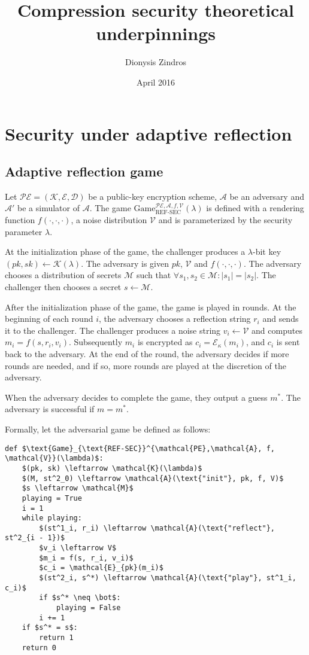 \documentclass{article}
\title{Compression security theoretical underpinnings}
\author{Dionysis Zindros}
\date{April 2016}
\begin{document}
\maketitle

\section*{Security under adaptive reflection}

\subsection*{Adaptive reflection game}

Let $\mathcal{PE} = (\mathcal{K}, \mathcal{E}, \mathcal{D})$ be a public-key
encryption scheme, $\mathcal{A}$ be an adversary and $\mathcal{A'}$ be a
simulator of $\mathcal{A}$.  The game
$\text{Game}_{\text{REF-SEC}}^{\mathcal{PE},\mathcal{A}, f,
\mathcal{V}}(\lambda)$ is defined with a rendering function $f(\cdot, \cdot,
\cdot)$, a noise distribution $\mathcal{V}$ and is parameterized by the
security parameter $\lambda$.

At the initialization phase of the game, the challenger produces a
$\lambda$-bit key $(pk, sk) \leftarrow \mathcal{K}(\lambda)$. The adversary is
given $pk$, $\mathcal{V}$ and $f(\cdot, \cdot, \cdot)$.  The adversary chooses
a distribution of secrets $\mathcal{M}$ such that $\forall s_1, s_2 \in
\mathcal{M}: |s_1| = |s_2|$.  The challenger then chooses a secret $s
\leftarrow \mathcal{M}$.

After the initialization phase of the game, the game is played in rounds. At
the beginning of each round $i$, the adversary chooses a reflection string
$r_i$ and sends it to the challenger. The challenger produces a noise string
$v_i \leftarrow \mathcal{V}$ and computes $m_i = f(s, r_i, v_i)$.  Subsequently
$m_i$ is encrypted as $c_i = \mathcal{E}_\kappa(m_i)$, and $c_i$ is sent back
to the adversary. At the end of the round, the adversary  decides if more
rounds are needed, and if so, more rounds are played at the discretion of the
adversary.

When the adversary decides to complete the game, they output a guess $m^*$. The
adversary is successful if $m = m^*$.

Formally, let the adversarial game be defined as follows:

\begin{lstlisting}[texcl,mathescape]
def $\text{Game}_{\text{REF-SEC}}^{\mathcal{PE},\mathcal{A}, f,
\mathcal{V}}(\lambda)$:
    $(pk, sk) \leftarrow \mathcal{K}(\lambda)$
    $(M, st^2_0) \leftarrow \mathcal{A}(\text{"init"}, pk, f, V)$
    $s \leftarrow \mathcal{M}$
    playing = True
    i = 1
    while playing:
        $(st^1_i, r_i) \leftarrow \mathcal{A}(\text{"reflect"}, st^2_{i - 1})$
        $v_i \leftarrow V$
        $m_i = f(s, r_i, v_i)$
        $c_i = \mathcal{E}_{pk}(m_i)$
        $(st^2_i, s^*) \leftarrow \mathcal{A}(\text{"play"}, st^1_i, c_i)$
        if $s^* \neq \bot$:
            playing = False
        i += 1
    if $s^* = s$:
        return 1
    return 0
\end{lstlisting}
\end{document}

